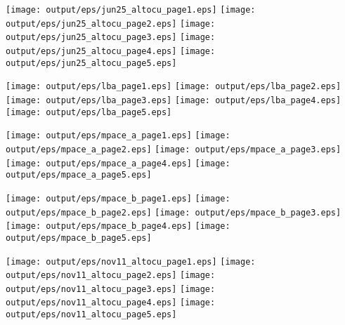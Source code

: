 \documentclass[11pt]{article}
\begin{document}
\begin{center}

\texttt{[image: output/eps/jun25\_altocu\_page1.eps]}
\texttt{[image: output/eps/jun25\_altocu\_page2.eps]}
\texttt{[image: output/eps/jun25\_altocu\_page3.eps]}
\texttt{[image: output/eps/jun25\_altocu\_page4.eps]}
\texttt{[image: output/eps/jun25\_altocu\_page5.eps]}
\end{center}
\newpage

\begin{center}

\texttt{[image: output/eps/lba\_page1.eps]}
\texttt{[image: output/eps/lba\_page2.eps]}
\texttt{[image: output/eps/lba\_page3.eps]}
\texttt{[image: output/eps/lba\_page4.eps]}
\texttt{[image: output/eps/lba\_page5.eps]}
\end{center}
\newpage

\begin{center}

\texttt{[image: output/eps/mpace\_a\_page1.eps]}
\texttt{[image: output/eps/mpace\_a\_page2.eps]}
\texttt{[image: output/eps/mpace\_a\_page3.eps]}
\texttt{[image: output/eps/mpace\_a\_page4.eps]}
\texttt{[image: output/eps/mpace\_a\_page5.eps]}
\end{center}
\newpage

\begin{center}

\texttt{[image: output/eps/mpace\_b\_page1.eps]}
\texttt{[image: output/eps/mpace\_b\_page2.eps]}
\texttt{[image: output/eps/mpace\_b\_page3.eps]}
\texttt{[image: output/eps/mpace\_b\_page4.eps]}
\texttt{[image: output/eps/mpace\_b\_page5.eps]}
\end{center}
\newpage

\begin{center}

\texttt{[image: output/eps/nov11\_altocu\_page1.eps]}
\texttt{[image: output/eps/nov11\_altocu\_page2.eps]}
\texttt{[image: output/eps/nov11\_altocu\_page3.eps]}
\texttt{[image: output/eps/nov11\_altocu\_page4.eps]}
\texttt{[image: output/eps/nov11\_altocu\_page5.eps]}
\end{center}
\newpage
\end{document}
